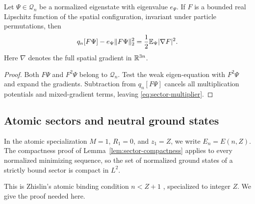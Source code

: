 \begin{lemma}
\label{lem:sector-multiplier}
Let $\Psi\in\mathcal Q_n$ be a normalized eigenstate with eigenvalue $e_\Psi$.
If $F$ is a bounded real Lipschitz function of the spatial configuration,
invariant under particle permutations, then
\begin{equation}\label{eq:sector-multiplier}
 q_n[F\Psi]-e_\Psi\|F\Psi\|_2^2
 =\frac12\mathbb E_\Psi|\nabla F|^2.
\end{equation}
Here $\nabla$ denotes the full spatial gradient in $\mathbb R^{3n}$.
\end{lemma}

\begin{proof}
Both $F\Psi$ and $F^2\Psi$ belong to $\mathcal Q_n$.  Test the weak
eigen-equation with $F^2\Psi$ and expand the gradients.  Subtraction
from $q_n[F\Psi]$ cancels all multiplication potentials and
mixed-gradient terms, leaving \eqref{eq:sector-multiplier}.
\end{proof}

\subsection{Atomic sectors and neutral ground states}

In the atomic specialization $M=1$, $R_1=0$, and $z_1=Z$, we write
$E_n=E(n,Z)$. The compactness proof of Lemma~\ref{lem:sector-compactness}
applies to every normalized minimizing sequence, so the set of normalized
ground states of a strictly bound sector is compact in $L^2$.

This is Zhislin's atomic binding condition $n<Z+1$
\citep{Zhislin1960,ZhislinSigalov1965}, specialized to integer $Z$.
We give the proof needed here.


